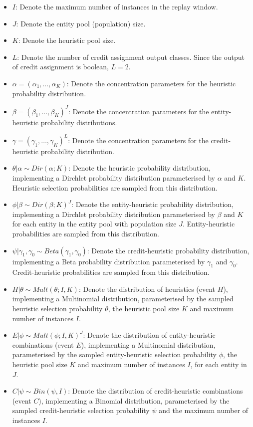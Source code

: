 \begin{itemize}
    \item $I$: Denote the maximum number of instances in the replay window.
    \item $J$: Denote the entity pool (population) size.
    \item $K$: Denote the heuristic pool size.
    \item $L$: Denote the number of credit assignment output classes. Since the output of credit assignment is boolean, $L = 2$.

    \item $\alpha = (\alpha_{1}, \dots, \alpha_{K})$: Denote the concentration parameters for the heuristic probability distribution.
    \item $\beta = (\beta_{1}, \dots, \beta_{K})^{J}$: Denote the concentration parameters for the entity-heuristic probability distributions.
    \item $\gamma = (\gamma_{1}, \dots, \gamma_{K})^{L}$: Denote the concentration parameters for the credit-heuristic probability distribution.

    \item $\theta \vert \alpha \sim Dir(\alpha; K)$: Denote the heuristic probability distribution, implementing a Dirchlet probability distribution parameterised by $\alpha$ and $K$. Heuristic selection probabilities are sampled from this distribution.
    \item $\phi \vert \beta \sim Dir(\beta; K)^{J}$: Denote the entity-heuristic probability distribution, implementing a Dirchlet probability distribution parameterised by $\beta$ and $K$ for each entity in the entity pool with population size $J$. Entity-heuristic probabilities are sampled from this distribution.
    \item $\psi \vert \gamma_{1}, \gamma_{0}  \sim Beta(\gamma_{1}, \gamma_{0})$: Denote the credit-heuristic probability distribution, implementing a Beta probability distribution parameterised by $\gamma_{1}$ and $\gamma_{0}$. Credit-heuristic probabilities are sampled from this distribution.

    \item $H \vert \theta \sim Mult(\theta; I, K)$: Denote the distribution of heuristics (event $H$), implementing a Multinomial distribution, parameterised by the sampled heuristic selection probability $\theta$, the heuristic pool size $K$ and maximum number of instances $I$.
    \item $E \vert \phi \sim Mult(\phi; I, K)^{J}$: Denote the distribution of entity-heuristic combinations (event $E$), implementing a Multinomial distribution, parameterised by the sampled entity-heuristic selection probability $\phi$, the heuristic pool size $K$ and maximum number of instances $I$, for each entity in $J$.
    \item $C \vert \psi \sim Bin(\psi, I)$: Denote the distribution of credit-heuristic combinations (event $C$), implementing a Binomial distribution, parameterised by the sampled credit-heuristic selection probability $\psi$ and the maximum number of instances $I$.
\end{itemize}

